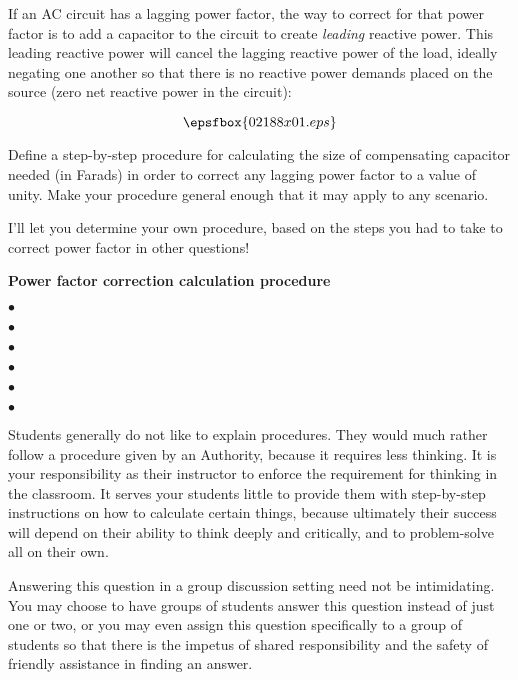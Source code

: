 

If an AC circuit has a lagging power factor, the way to correct for that power factor is to add a capacitor to the circuit to create {\it leading} reactive power.  This leading reactive power will cancel the lagging reactive power of the load, ideally negating one another so that there is no reactive power demands placed on the source (zero net reactive power in the circuit):

$$\epsfbox{02188x01.eps}$$

Define a step-by-step procedure for calculating the size of compensating capacitor needed (in Farads) in order to correct any lagging power factor to a value of unity.  Make your procedure general enough that it may apply to any scenario.







I'll let you determine your own procedure, based on the steps you had to take to correct power factor in other questions!

\medskip
\goodbreak
\item{} {\bf Power factor correction calculation procedure} 
\item{$\bullet$}
\vskip 5pt 
\item{$\bullet$} 
\vskip 5pt 
\item{$\bullet$} 
\vskip 5pt 
\item{$\bullet$} 
\vskip 5pt 
\item{$\bullet$} 
\vskip 5pt 
\item{$\bullet$} 
\medskip







Students generally do not like to explain procedures.  They would much rather follow a procedure given by an Authority, because it requires less thinking.  It is your responsibility as their instructor to enforce the requirement for thinking in the classroom.  It serves your students little to provide them with step-by-step instructions on how to calculate certain things, because ultimately their success will depend on their ability to think deeply and critically, and to problem-solve all on their own.

Answering this question in a group discussion setting need not be intimidating.  You may choose to have groups of students answer this question instead of just one or two, or you may even assign this question specifically to a group of students so that there is the impetus of shared responsibility and the safety of friendly assistance in finding an answer.




